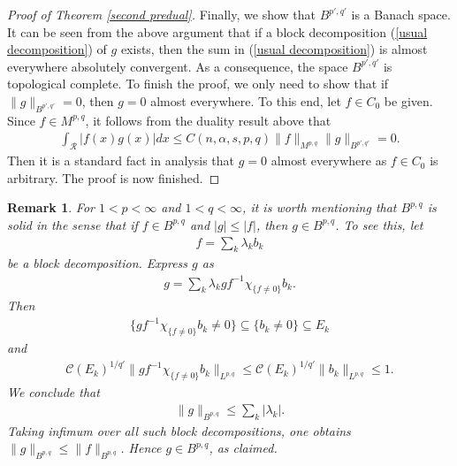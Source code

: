 \documentclass[10pt,reqno]{amsart}
\newtheorem{remark}[theorem]{Remark}
\numberwithin{equation}{section}
\begin{document}
\begin{proof}[Proof of Theorem \ref{second predual}]
Finally, we show that $B^{p',q'}$ is a Banach space. It can be seen from the above argument that if a block decomposition (\ref{usual decomposition}) of $g$ exists, then the sum in (\ref{usual decomposition}) is almost everywhere absolutely convergent. As a consequence, the space $B^{p',q'}$ is topological complete. To finish the proof, we only need to show that if $\|g\|_{B^{p',q'}}=0$, then $g=0$ almost everywhere. To this end, let $f\in C_{0}$ be given. Since $f\in M^{p,q}$, it follows from the duality result above that
\begin{align*}
\int_{\mathcal{R}}|f(x)g(x)|dx\leq C(n,\alpha,s,p,q)\|f\|_{M^{p,q}}\|g\|_{B^{p',q'}}=0.
\end{align*}
Then it is a standard fact in analysis that $g=0$ almost everywhere as $f\in C_{0}$ is arbitrary. The proof is now finished.
\end{proof}

\begin{remark}
\rm For $1<p<\infty$ and $1<q<\infty$, it is worth mentioning that $B^{p,q}$ is solid in the sense that if $f\in B^{p,q}$ and $|g|\leq|f|$, then $g\in B^{p,q}$. To see this, let
\begin{align*}
f=\sum_{k}\lambda_{k}b_{k}
\end{align*}
be a block decomposition. Express $g$ as
\begin{align*}
g=\sum_{k}\lambda_{k}gf^{-1}\chi_{\{f\ne 0\}}b_{k}.
\end{align*}
Then
\begin{align*}
\{gf^{-1}\chi_{\{f\ne 0\}}b_{k}\ne 0\}\subseteq\{b_{k}\ne 0\}\subseteq E_{k}
\end{align*}
and
\begin{align*}
\mathcal{C}(E_{k})^{1/q'}\|gf^{-1}\chi_{\{f\ne 0\}}b_{k}\|_{L^{p,q}}\leq\mathcal{C}(E_{k})^{1/q'}\|b_{k}\|_{L^{p,q}}\leq 1.
\end{align*}
We conclude that 
\begin{align*}
\|g\|_{B^{p,q}}\leq\sum_{k}|\lambda_{k}|.
\end{align*}
Taking infimum over all such block decompositions, one obtains $\|g\|_{B^{p,q}}\leq\|f\|_{B^{p,q}}$. Hence $g\in B^{p,q}$, as claimed.
\end{remark}
\end{document}
